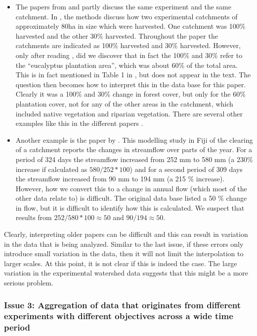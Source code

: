 \documentclass[]{elsarticle} %
\providecommand{\tightlist}{%
  \setlength{\itemsep}{0pt}\setlength{\parskip}{0pt}}
\begin{document}
\begin{itemize}
\tightlist
\item
  The papers from \citet{almeida2016} and \citet{ferreto2020} partly discuss the same experiment and the same catchment. In \citet{almeida2016}, the methods discuss how two experimental catchments of approximately 80ha in size which were harvested. One catchment was 100\% harvested and the other 30\% harvested. Throughout the paper the catchments are indicated as 100\% harvested and 30\% harvested. However, only after reading \citet{ferreto2020}, did we discover that in fact the 100\% and 30\% refer to the ``eucalyptus plantation area'', which was about 60\% of the total area. This is in fact mentioned in Table 1 in \citet{almeida2016}, but does not appear in the text. The question then becomes how to interpret this in the data base for this paper. Clearly it was a 100\% and 30\% change in forest cover, but only for the 60\% plantation cover, not for any of the other areas in the catchment, which included native vegetation and riparian vegetation. There are several other examples like this in the different papers \citep[for example][]{blackie1979kimakia, blackie1979kericho}.
\item
  Another example is the paper by \citet{waterloo2007}. This modelling study in Fiji of the clearing of a catchment reports the changes in streamflow over parts of the year. For a period of 324 days the streamflow increased from 252 mm to 580 mm (a 230\% increase if calculated as \(580/252*100\)) and for a second period of 309 days the streamflow increased from 90 mm to 194 mm (a 215 \% increase). However, how we convert this to a change in annual flow (which most of the other data relate to) is difficult. The original data base listed a 50 \% change in flow, but it is difficult to identify how this is calculated. We suspect that results from \(252/580*100 \approx 50\) and \(90/194 \approx 50\).
\end{itemize}

Clearly, interpreting older papers can be difficult and this can result in variation in the data that is being analyzed. Similar to the last issue, if these errors only introduce small variation in the data, then it will not limit the interpolation to larger scales. At this point, it is not clear if this is indeed the case. The large variation in the experimental watershed data suggests that this might be a more serious problem.

\hypertarget{issue-3-aggregation-of-data-that-originates-from-different-experiments-with-different-objectives-across-a-wide-time-period}{%
\subsubsection{Issue 3: Aggregation of data that originates from different experiments with different objectives across a wide time period}\label{issue-3-aggregation-of-data-that-originates-from-different-experiments-with-different-objectives-across-a-wide-time-period}}
\end{document}

